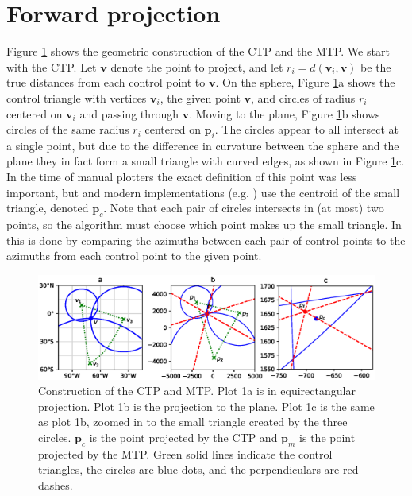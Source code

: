 \documentclass[]{interact}
\begin{document}
\section{Forward projection}
Figure \ref{fig:chamberlin} shows the geometric construction of the CTP and the
MTP. We start with the CTP. Let $\mathbf v$ denote the point to project, and
let $r_i = d(\mathbf v_i, \mathbf v)$ be the true distances from each control
point to $\mathbf v$. On the sphere, Figure \ref{fig:chamberlin}a shows the
control triangle with vertices $\mathbf v_i$, the given point $\mathbf v$, and
circles of radius $r_i$ centered on $\mathbf v_i$ and passing through
$\mathbf v$. Moving to the plane, Figure \ref{fig:chamberlin}b shows circles of
the same radius $r_i$ centered on $\mathbf p_i$. The circles appear to all
intersect at a single point, but due to the difference in curvature between the
sphere and the plane they in fact form a small triangle with curved edges, as
shown in Figure \ref{fig:chamberlin}c. In the time of manual plotters the exact
definition of this point was less important, but \citet{christensen} and modern
implementations (e.g. \citealp{proj}) use the centroid of the small triangle,
denoted $\mathbf p_c$.
Note that each pair of circles intersects in (at most) two points,
so the algorithm must choose which point makes up the small triangle.
In \citet{christensen} this is done by comparing the azimuths between each pair
of control points to the azimuths from each control point to the given point.

\begin{figure}
  \includegraphics[width=\textwidth]{construction}
  \caption{Construction of the CTP and MTP. Plot 1a is in equirectangular
  projection. Plot 1b is the projection to the plane. Plot 1c is the same as
  plot 1b, zoomed in to the small triangle created by the three circles.
  $\mathbf p_c$ is the point projected by the CTP and $\mathbf p_m$ is the
  point projected by the MTP. Green solid lines indicate the control
  triangles, the circles are blue dots, and the perpendiculars are red dashes.}
  \label{fig:chamberlin}%
\end{figure}
\end{document}
